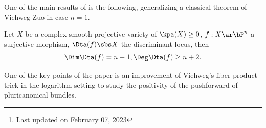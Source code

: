 \documentclass[a4paper, twoside]{article}
\title{\tbf{Park2022}}
\author{\tbf{Notes} by Cong Wen, 02/2023}
\date{}
\begin{document}
\maketitle
\thispagestyle{empty}
\begin{abstract}
	This is my self-use notes\footnote{Last updated on February 07, 2023} on the talk given by  at  on his work\cite{Park2022BaseChange}. Please reach out if you find anything incorrect.

\end{abstract}
\tableofcontents

One of the main results of \cite{Park2022BaseChange} is the following, generalizing a classical theorem of Viehweg-Zuo\cite[Theorem~0.2]{VZ2001} in case $n=1$.
\begin{thm}
	Let $X$ be a complex smooth projective variety of $\kpa(X)\geq0$, $f:X\ar\bP^{n}$ a surjective morphism, $\Dta(f)\sbs X$ the discriminant locus, then
	\[
		\Dim\Dta(f)=n-1,\Deg\Dta(f)\geq n+2.
	\]
\end{thm}


One of the key points of the paper is an improvement of Viehweg's fiber product trick in the logarithm setting to study the positivity of the pushforward of pluricanonical bundles.












\end{document}
